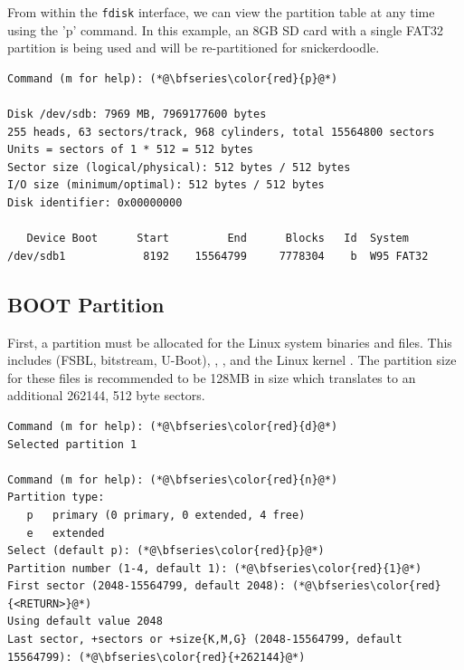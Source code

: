 
From within the \texttt{fdisk} interface, we can view the partition table at any time using the 'p' command. In this example, an 8GB SD card with a single FAT32 partition is being used and will be re-partitioned for snickerdoodle.


\begin{lstlisting}[style=text]
Command (m for help): (*@\bfseries\color{red}{p}@*)

Disk /dev/sdb: 7969 MB, 7969177600 bytes
255 heads, 63 sectors/track, 968 cylinders, total 15564800 sectors
Units = sectors of 1 * 512 = 512 bytes
Sector size (logical/physical): 512 bytes / 512 bytes
I/O size (minimum/optimal): 512 bytes / 512 bytes
Disk identifier: 0x00000000

   Device Boot      Start         End      Blocks   Id  System
/dev/sdb1            8192    15564799     7778304    b  W95 FAT32
\end{lstlisting}


\subsection{BOOT Partition}
First, a partition must be allocated for the Linux system binaries and files. This includes  (FSBL, bitstream, U-Boot), , , and the Linux kernel . The partition size for these files is recommended to be 128MB in size which translates to an additional 262144, 512 byte sectors.


\clearpage
\begin{lstlisting}[style=text]
Command (m for help): (*@\bfseries\color{red}{d}@*)
Selected partition 1

Command (m for help): (*@\bfseries\color{red}{n}@*)
Partition type:
   p   primary (0 primary, 0 extended, 4 free)
   e   extended
Select (default p): (*@\bfseries\color{red}{p}@*)
Partition number (1-4, default 1): (*@\bfseries\color{red}{1}@*)
First sector (2048-15564799, default 2048): (*@\bfseries\color{red}{<RETURN>}@*)
Using default value 2048
Last sector, +sectors or +size{K,M,G} (2048-15564799, default 15564799): (*@\bfseries\color{red}{+262144}@*)
\end{lstlisting}



